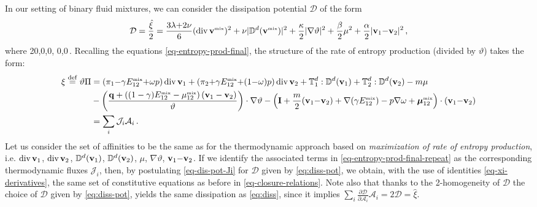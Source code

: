 \documentclass[a4paper]{article}
\begin{document}
In our setting of binary fluid mixtures, we can consider the dissipation potential $\mathcal{D}$ of the form 
\begin{align}
\label{eq:diss-pot}
	\mathcal{D} = \frac{\hat{\xi}}{2} =  \frac{3\lambda{+}2\nu}{6}(\mathop{\rm div}\nolimits{\bf v}^{\mbox{\tiny{mix}}})^2+\nu |\mathbb{D}^d({\bf v}^{\mbox{\tiny{mix}}}) |^2 + \frac{\kappa}{2}|\nabla\vartheta|^2+\frac{\beta}{2}\mu^2 + \frac{\alpha}{2}|{\bf v}_{1}{-}{\bf v}_2|^2\,,
\end{align}
where
\lambda{+}2\nu{>}0,\quad \nu{>}0,\quad\kappa{>}0,\quad\beta{>} 0,\quad\alpha{>}0\,.
\ee
Recalling the equations \eqref{eq-entropy-prod-final}, the structure of the rate of entropy production (divided by $\vartheta$) takes the form:
\begin{align}
\nonumber
\xi\stackrel{\mathrm{def}}{=} \vartheta\Pi &=   (\pi_1{-}\gamma E_{12}^{\mbox{\tiny{mix}}}{+}\omega p)\mathop{\rm div}\nolimits{\bf v}_1 + (\pi_2{+}\gamma E_{12}^{\mbox{\tiny{mix}}}{+}(1{-}\omega)p)\mathop{\rm div}\nolimits{\bf v}_2 + \mathbb{T}^d_1:\mathbb{D}^d({\bf v}_1) + \mathbb{T}^d_2:\mathbb{D}^d({\bf v}_2)  -m \mu  \\\label{eq-entropy-prod-final-repeat} &  -\left(\frac{{\bf{q}}+\left((1-\gamma)E_{12}^{\mbox{\tiny{mix}}} -\mu_{12}^{\mbox{\tiny{mix}}}\right)({\bf v}_1-{\bf v}_2)}{\vartheta}\right)\cdot\nabla\vartheta - \left({\mathbf{I}} + \frac{m}{2}({\bf v}_1{-}{\bf v}_2) + \nabla(\gamma E_{12}^{\mbox{\tiny{mix}}}) - p\nabla \omega + \boldsymbol{\mu}_{12}^{\mbox{\tiny{mix}}}  \right)\cdot({\bf v}_1{-}{\bf v}_2)\\ \nonumber &= \sum_i \mathcal{J}_i\mathcal{A}_i\,.
\end{align}
Let us consider the set of affinities to be the same as for the thermodynamic approach based on \textit{maximization of rate of entropy production}, i.e. $\mathop{\rm div}\nolimits{\bf v}_1$, $\mathop{\rm div}\nolimits{\bf v}_2$, $\mathbb{D}^d({\bf v}_1)$, $\mathbb{D}^d({\bf v}_2)$, $\mu$, $\nabla\vartheta$, ${\bf v}_1{-}{\bf v}_2$. If we identify the associated terms in \eqref{eq-entropy-prod-final-repeat} as the corresponding thermodynamic fluxes $\mathcal{J}_i$, then, by postulating \eqref{eq-dis-pot-Ji} for $\mathcal{D}$ given by \eqref{eq:diss-pot}, we obtain, with the use of identities \eqref{eq-xi-derivatives}, the same set of constitutive equations as before in \eqref{eq-closure-relations}.
Note also that thanks to the 2-homogeneity of $\mathcal{D}$ the choice of $\mathcal{D}$ given by \eqref{eq:diss-pot}, yields the same dissipation as \eqref{eq:diss}, since it implies 
 $\sum_i \frac{\partial\mathcal{D}}{\partial \mathcal{A}_i}\mathcal{A}_i = 2\mathcal{D} = \hat{\xi}$.
\end{document}

